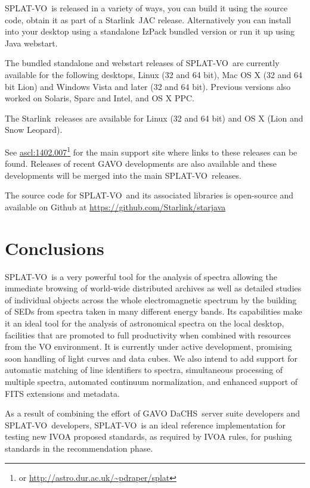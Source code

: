 \documentclass[final,authoryear,5p,times,twocolumn]{elsarticle}
\newcommand{\splatvo}{{\textsf{\small{SPLAT-VO}}}}
\newcommand{\dachs}{\textsf{\small DaCHS}}
\newcommand{\Starlink}{\textsf{\small Starlink}}
\newcommand{\ascl}[1]{\href{http://www.ascl.net/#1}{ascl:#1}}
\begin{document}
\splatvo\ is released in a variety of ways, you can build it using the source
code, obtain it as part of a \Starlink\ JAC release. Alternatively you can
install into your desktop using a standalone IzPack bundled version or run it
up using Java webstart.

The bundled standalone and webstart releases of \splatvo\ are currently
available for the following desktops, Linux (32 and 64 bit), Mac OS X (32 and
64 bit Lion) and Windows Vista and later (32 and 64 bit). Previous versions
also worked on Solaris, Sparc and Intel, and OS X PPC.

The \Starlink\ releases \citep[e.g.,][]{currie_adassxxiii,2013ASPC..475..247B}
are available for Linux (32 and 64 bit) and OS X (Lion and Snow Leopard).

See \ascl{1402.007}\footnote{or \url{http://astro.dur.ac.uk/~pdraper/splat}}
for the main support site where links to these releases can be found.  Releases
of recent GAVO developments are also available and these developments will be
merged into the main \splatvo\ releases.

The source code for \splatvo\ and its associated libraries is open-source and
available on Github at \url{https://github.com/Starlink/starjava}

\section{Conclusions}

\splatvo\ is a very powerful tool for the analysis of spectra allowing the
immediate browsing of world-wide distributed archives as well as detailed
studies of individual objects across the whole electromagnetic spectrum by the
building of SEDs from spectra taken in many different energy bands. Its
capabilities make it an ideal tool for the analysis of astronomical spectra on
the local desktop, facilities that are promoted to full productivity when
combined with resources from the VO environment. It is currently under active
development, promising soon handling of light curves and data cubes. We also
intend to add support for automatic matching of line identifiers to spectra,
simultaneous processing of multiple spectra, automated continuum normalization,
and enhanced support of FITS extensions and metadata.

As a result of combining the effort of GAVO \dachs\ server suite developers and
\splatvo\ developers, \splatvo\ is an ideal reference implementation for
testing new IVOA proposed standards, as required by IVOA rules, for pushing
standards in the recommendation phase.
\end{document}

